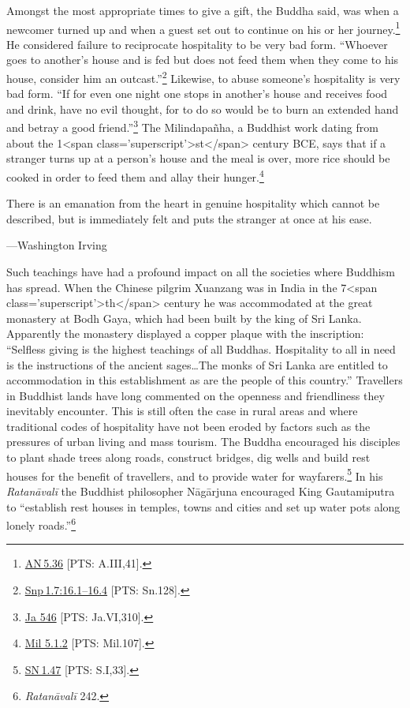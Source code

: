 \documentclass[10pt, openright]{book}
\newenvironment{epigram-2}%
{%
\vspace{1em}
\noindent
\quoting[leftmargin=2.5cm,rightmargin=2.5cm]%
\begin{itshape}
\large
}%
{\end{itshape}\endquoting
}%
\newenvironment{epigram-2-cite}%
{%
\quoting[leftmargin=2.5cm,rightmargin=2.5cm]%
\noindent\normal\hspace*{\fill} 
}%
{\endquoting\vspace{1em}
}%
\begin{document}
Amongst the most appropriate times to give a gift, the Buddha said, was when a newcomer turned up and when a guest set out to continue on his or her journey.\footnote {\href{https://suttacentral.net/an5.36/en/sujato}{AN 5.36} [PTS: A.III,41].} He considered failure to reciprocate hospitality to be very bad form. “Whoever goes to another’s house and is fed but does not feed them when they come to his house, consider him an outcast.”\footnote {\href{https://suttacentral.net/snp1.7/en/sujato\#16.1}{Snp 1.7:16.1–16.4} [PTS: Sn.128].} Likewise, to abuse someone’s hospitality is very bad form. “If for even one night one stops in another’s house and receives food and drink, have no evil thought, for to do so would be to burn an extended hand and betray a good friend.”\footnote {\href{https://suttacentral.net/ja546/en/cowell-rouse?reference=main/pts#pts-vp-pli310}{Ja 546} [PTS: Ja.VI,310].} The Milindapañha, a Buddhist work dating from about the 1<span class='superscript'>st</span> century BCE, says that if a stranger turns up at a person’s house and the meal is over, more rice should be cooked in order to feed them and allay their hunger.\footnote {\href{https://suttacentral.net/mil5.1.2/en/tw_rhysdavids?reference=main/pts#pts-vp-pli107}{Mil 5.1.2} [PTS: Mil.107].}


\begin{epigram-2}
There is an emanation from the heart in genuine hospitality which cannot be described, but is immediately felt and puts the stranger at once at his ease.
\end{epigram-2}

\begin{epigram-2-cite}
—Washington Irving
\end{epigram-2-cite}

Such teachings have had a profound impact on all the societies where Buddhism has spread. When the Chinese pilgrim Xuanzang was in India in the 7<span class='superscript'>th</span> century he was accommodated at the great monastery at Bodh Gaya, which had been built by the king of Sri Lanka. Apparently the monastery displayed a copper plaque with the inscription: “Selfless giving is the highest teachings of all Buddhas. Hospitality to all in need is the instructions of the ancient sages…The monks of Sri Lanka are entitled to accommodation in this establishment as are the people of this country.” Travellers in Buddhist lands have long commented on the openness and friendliness they inevitably encounter. This is still often the case in rural areas and where traditional codes of hospitality have not been eroded by factors such as the pressures of urban living and mass tourism. The Buddha encouraged his disciples to plant shade trees along roads, construct bridges, dig wells and build rest houses for the benefit of travellers, and to provide water for wayfarers.\footnote {\href{https://suttacentral.net/sn1.47/en/sujato}{SN 1.47} [PTS: S.I,33].} In his \textit{Ratanāvalī} the Buddhist philosopher Nāgārjuna encouraged King Gautamiputra to “establish rest houses in temples, towns and cities and set up water pots along lonely roads.”\footnote {\textit{Ratanāvalī} 242.}
\end{document}
